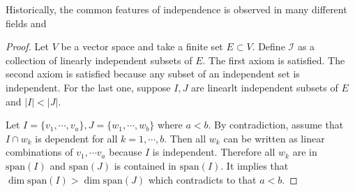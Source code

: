


Historically, the common features of independence is observed in many different fields and 



\begin{proof}
    Let $V$ be a vector space and take a finite set $E \subset V$. Define $\mathcal{I}$ as a collection of linearly independent subsets of $E$. The first axiom is satisfied. The second axiom is satisfied because any subset of an independent set is independent. For the last one, suppose $I, J$ are linearlt independent subsets of $E$ and $|I|<|J|$.

    Let $I = \{v_1, \cdots, v_a\}, J = \{w_1, \cdots, w_b\}$ where $a<b$. By contradiction, assume that $I \cap w_k$ is dependent for all $k = 1, \cdots, b$. Then all $w_k$ can be written as linear combinations of $v_1, \cdots v_a$ because $I$ is independent. Therefore all $w_k$ are in $\mathrm{span}(I)$ and $\mathrm{span}(J)$ is contained in $\mathrm{span}(I)$. It implies that $\dim \mathrm{span}(I) > \dim \mathrm{span}(J)$ which contradicts to that $a<b$.
\end{proof}

